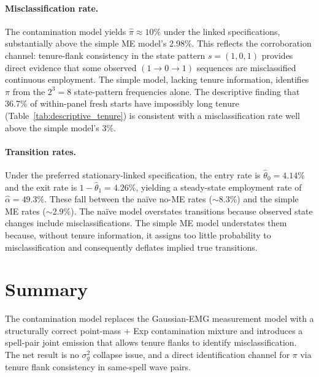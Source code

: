 \documentclass[12pt]{article}
\begin{document}
\paragraph{Misclassification rate.}
The contamination model yields $\hat\pi \approx 10\%$ under the linked
specifications, substantially above the simple ME model's 2.98\%. This
reflects the corroboration channel: tenure-flank consistency in the state
pattern $s = (1,0,1)$ provides direct evidence that some observed
$(1 \to 0 \to 1)$ sequences are misclassified continuous employment. The
simple model, lacking tenure information, identifies $\pi$ from the
$2^3 = 8$ state-pattern frequencies alone. The descriptive finding that
36.7\% of within-panel fresh starts have impossibly long tenure
(Table~\ref{tab:descriptive_tenure}) is consistent with a
misclassification rate well above the simple model's 3\%.

\paragraph{Transition rates.}
Under the preferred stationary-linked specification, the entry rate is
$\hat\theta_0 = 4.14\%$ and the exit rate is
$1 - \hat\theta_1 = 4.26\%$, yielding a steady-state employment rate of
$\hat\alpha = 49.3\%$. These fall between the na\"ive no-ME rates
($\sim$8.3\%) and the simple ME rates ($\sim$2.9\%). The na\"ive model
overstates transitions because observed state changes include
misclassifications. The simple ME model understates them because, without
tenure information, it assigns too little probability to misclassification
and consequently deflates implied true transitions.


\section{Summary}

The contamination model replaces the Gaussian-EMG measurement model with a structurally
correct point-mass + Exp contamination mixture and introduces a spell-pair
joint emission that allows tenure flanks to identify misclassification.
The net result is no
\(\sigma_g^2\) collapse issue, and a direct identification channel for
\(\pi\) via tenure flank consistency in same-spell wave pairs.
\end{document}
